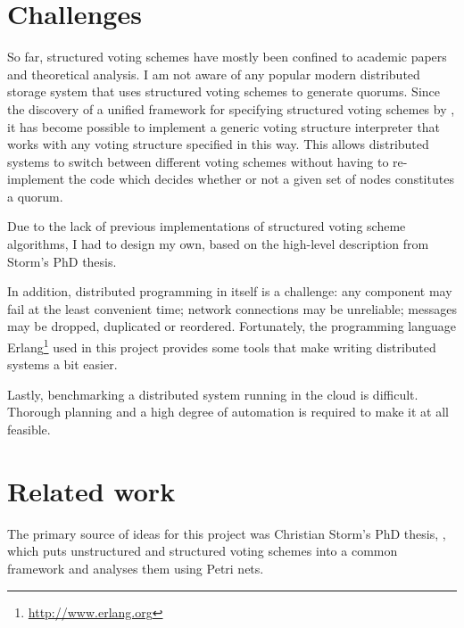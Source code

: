 \documentclass[12pt,chapterprefix=true,toc=bibliography,numbers=noendperiod,
               footnotes=multiple,twoside]{scrreprt}
\begin{document}

\section{Challenges}
\label{sc:challenges}

So far, structured voting schemes have mostly been confined to academic papers and theoretical analysis. I am not aware of any popular modern distributed storage system that uses structured voting schemes to generate quorums. Since the discovery of a unified framework for specifying structured voting schemes by \citeauthor{generators},\autocite{generators} it has become possible to implement a generic voting structure interpreter that works with any voting structure specified in this way. This allows distributed systems to switch between different voting schemes without having to re-implement the code which decides whether or not a given set of nodes constitutes a quorum.

Due to the lack of previous implementations of structured voting scheme algorithms, I had to design my own, based on the high-level description from Storm's PhD thesis.\autocite{voting}

In addition, distributed programming in itself is a challenge: any component may fail at the least convenient time; network connections may be unreliable; messages may be dropped, duplicated or reordered. Fortunately, the programming language Erlang\footnote{\url{http://www.erlang.org}} used in this project provides some tools that make writing distributed systems a bit easier.

Lastly, benchmarking a distributed system running in the cloud is difficult. Thorough planning and a high degree of automation is required to make it at all feasible.

\section{Related work}
\label{sc:related-work}

The primary source of ideas for this project was Christian Storm's PhD thesis,  \parencite{voting}, which puts unstructured and structured voting schemes into a common framework and analyses them using Petri nets.
\end{document}
